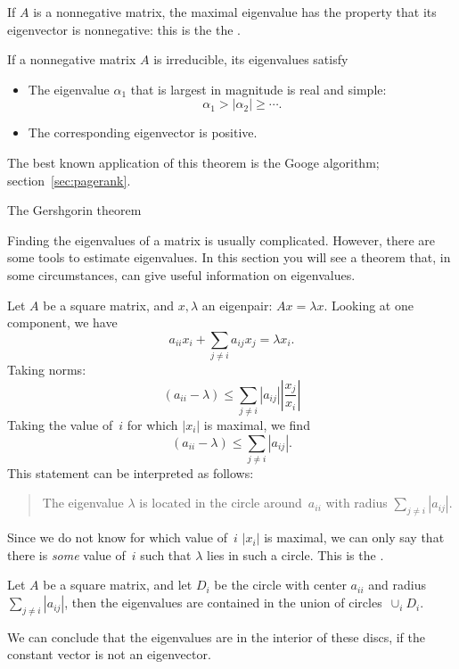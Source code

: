 If $A$ is a nonnegative matrix, the maximal eigenvalue has the
property that its eigenvector is nonnegative: this is the the
.

\begin{theorem}
  If a nonnegative matrix $A$ is irreducible, its eigenvalues
  satisfy
  \begin{itemize}
  \item The eigenvalue $\alpha_1$ that is largest in magnitude is real
    and simple:
    \[ \alpha_1> |\alpha_2|\geq\cdots. \]
  \item The corresponding eigenvector is positive.
  \end{itemize}
\end{theorem}

The best known application of this theorem is the
Googe  algorithm; section~\ref{sec:pagerank}.

 {The Gershgorin theorem}
\label{app:gershgorin}

Finding the eigenvalues of a matrix is usually complicated. However,
there are some tools to estimate eigenvalues. In this section you will
see a theorem that, in some circumstances, can give useful information
on eigenvalues.

Let $A$ be a square matrix, and $x,\lambda$ an eigenpair: $Ax=\lambda
x$. Looking at one component, we have
\[ a_{ii}x_i+\sum_{j\not=i} a_{ij}x_j=\lambda x_i. \]
Taking norms:
\[ (a_{ii}-\lambda) \leq \sum_{j\not=i} |a_{ij}|
   \left|\frac{x_j}{x_i}\right|
\]
Taking the value of~$i$ for which $|x_i|$ is maximal, we find
\[ (a_{ii}-\lambda) \leq \sum_{j\not=i} |a_{ij}|.
\]
This statement can be interpreted as follows: 
\begin{quotation}
  The eigenvalue $\lambda$ is located in the circle around~$a_{ii}$
  with radius $\sum_{j\not=i}|a_{ij}|$.
\end{quotation}
Since we do not know for which value of~$i$ $|x_i|$ is maximal, we can
only say that there is \emph{some} value of~$i$ such that $\lambda$
lies in such a circle.
This is the .

\begin{theorem}
  Let $A$ be a square matrix, and let $D_i$ be the circle with center
  $a_{ii}$ and radius $\sum_{j\not=i}|a_{ij}|$, then the eigenvalues
  are contained in the union of circles~$\cup_i D_i$.
\end{theorem}

We can conclude that the eigenvalues are in the interior of these
discs, if the constant vector is not an eigenvector.

